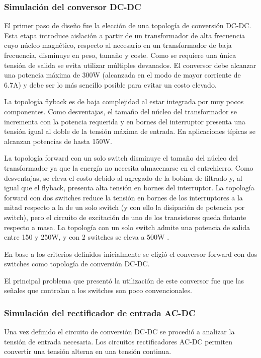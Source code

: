 \subsubsection{Simulación del conversor DC-DC}
El primer paso de diseño fue la elección de una topología de conversión DC-DC.
Esta etapa introduce aislación a partir de un transformador de alta frecuencia 
cuyo núcleo magnético, respecto al necesario en un transformador de baja frecuencia,
disminuye en peso, tamaño y coste. Como se requiere una única tensión de salida se
evita utilizar múltiples devanados. El conversor debe alcanzar una potencia
máxima de 300W (alcanzada en el modo de mayor corriente de 6.7A) y debe ser lo más sencillo posible para evitar un costo elevado. 

La topología flyback es de baja complejidad al estar integrada por muy pocos componentes. 
Como desventajas, el tamaño del núcleo del transformador se incrementa con la potencia requerida y en bornes del
interruptor presenta una tensión igual al doble de la tensión máxima de entrada.
En aplicaciones típicas se alcanzan potencias de hasta 150W.

La topología forward con un solo switch disminuye el tamaño del núcleo del
transformador ya que la energía no necesita almacenarse en el entrehierro. Como
desventajas, se eleva el costo debido al agregado de la bobina de filtrado y, al igual que el flyback, 
presenta alta tensión en bornes del interruptor. 
La topología forward con dos switches reduce la tensión en bornes de los interruptores a
la mitad respecto a la de un solo switch (y con ello la disipación de potencia
por switch), pero el circuito de excitación de uno de los transistores queda
flotante respecto a masa. La topología con un solo switch admite una potencia de
salida entre 150 y 250W, y con 2 switches se eleva a 500W \cite{mohan}\cite{hart}.

En base a los criterios definidos inicialmente se eligió el conversor forward
con dos switches como topología de conversión DC-DC. 

El principal problema que presentó la utilización de este conversor fue que las señales que controlan a los switches son poco convencionales.

\subsubsection{Simulación del rectificador de entrada AC-DC}
Una vez definido el circuito de conversión DC-DC se procedió a analizar la tensión de entrada necesaria. 
Los circuitos rectificadores AC-DC permiten convertir una tensión alterna en una tensión continua.

